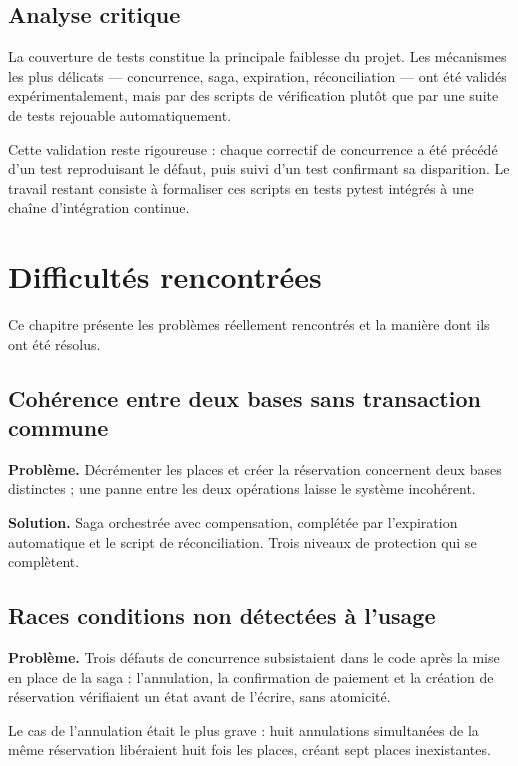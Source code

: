 \documentclass[11pt,a4paper]{report}
\begin{document}
\section{Analyse critique}

La couverture de tests constitue la principale faiblesse du projet. Les
mécanismes les plus délicats — concurrence, saga, expiration, réconciliation —
ont été validés expérimentalement, mais par des scripts de vérification plutôt
que par une suite de tests rejouable automatiquement.

Cette validation reste rigoureuse : chaque correctif de concurrence a été
précédé d'un test reproduisant le défaut, puis suivi d'un test confirmant sa
disparition. Le travail restant consiste à formaliser ces scripts en tests
pytest intégrés à une chaîne d'intégration continue.

\chapter{Difficultés rencontrées}

Ce chapitre présente les problèmes réellement rencontrés et la manière dont ils
ont été résolus.

\section{Cohérence entre deux bases sans transaction commune}

\textbf{Problème.} Décrémenter les places et créer la réservation concernent deux
bases distinctes ; une panne entre les deux opérations laisse le système
incohérent.

\textbf{Solution.} Saga orchestrée avec compensation, complétée par l'expiration
automatique et le script de réconciliation. Trois niveaux de protection qui se
complètent.

\section{Races conditions non détectées à l'usage}

\textbf{Problème.} Trois défauts de concurrence subsistaient dans le code après
la mise en place de la saga : l'annulation, la confirmation de paiement et la
création de réservation vérifiaient un état avant de l'écrire, sans atomicité.

Le cas de l'annulation était le plus grave : huit annulations simultanées de la
même réservation libéraient huit fois les places, créant sept places
inexistantes.
\end{document}
